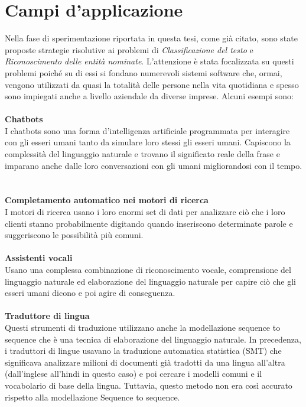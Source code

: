 \section{Campi d'applicazione}
Nella fase di sperimentazione riportata in questa tesi, come già citato, sono state proposte strategie risolutive ai problemi di \textit{Classificazione del testo} e \textit{Riconoscimento delle entità nominate}. L'attenzione è stata focalizzata su questi problemi poiché su di essi si fondano numerevoli sistemi software che, ormai, vengono utilizzati da quasi la totalità delle persone nella vita quotidiana e spesso sono impiegati anche a livello aziendale da diverse imprese. Alcuni esempi sono:\\\\
\textbf{Chatbots}\\
I chatbots sono una forma d'intelligenza artificiale programmata per interagire con gli esseri umani tanto da simulare loro stessi gli esseri umani. Capiscono la complessità del linguaggio naturale e trovano il significato reale della frase e imparano anche dalle loro conversazioni con gli umani migliorandosi con il tempo.\\\\
\\
\textbf{Completamento automatico nei motori di ricerca}\\
I motori di ricerca usano i loro enormi set di dati per analizzare ciò che i loro clienti stanno probabilmente digitando quando inseriscono determinate parole e suggeriscono le possibilità più comuni.\\\\
\textbf{Assistenti vocali}\\
Usano una complessa combinazione di riconoscimento vocale, comprensione del linguaggio naturale ed elaborazione del linguaggio naturale per capire ciò che gli esseri umani dicono e poi agire di conseguenza.\\\\
\textbf{Traduttore di lingua}\\
Questi strumenti di traduzione utilizzano anche la modellazione sequence to sequence che è una tecnica di elaborazione del linguaggio naturale. In precedenza, i traduttori di lingue usavano la traduzione automatica statistica (SMT) che significava analizzare milioni di documenti già tradotti da una lingua all'altra (dall'inglese all'hindi in questo caso) e poi cercare i modelli comuni e il vocabolario di base della lingua. Tuttavia, questo metodo non era così accurato rispetto alla modellazione Sequence to sequence.\\\\
